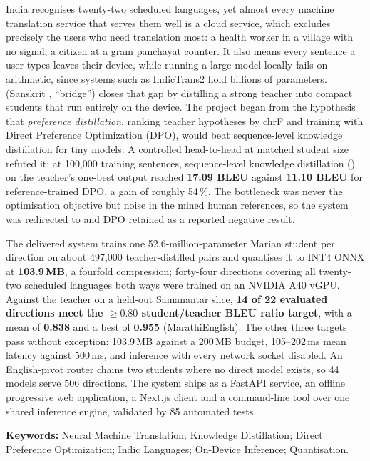 \setcounter{page}{1}
\usefrontmatterstyle
\thispagestyle{frontmatter}

{\fontsize{12}{18}\selectfont
\setlength{\parindent}{0.5in}

India recognises twenty-two scheduled languages, yet almost every machine
translation service that serves them well is a cloud service, which excludes
precisely the users who need translation most: a health worker in a village
with no signal, a citizen at a gram panchayat counter. It also means every
sentence a user types leaves their device, while
running a large model locally fails on arithmetic, since systems such as
IndicTrans2 hold billions of parameters. \setu{} (Sanskrit
, ``bridge'') closes that gap by distilling a strong teacher into
compact students that run entirely on the device. The project began from the
hypothesis that \emph{preference distillation}, ranking teacher hypotheses by
chrF and training with Direct Preference Optimization (DPO), would beat
sequence-level knowledge distillation for tiny models. A controlled head-to-head
at matched student size refuted it: at 100{,}000 training sentences,
sequence-level knowledge distillation (\seqkd{}) on the teacher's one-best
output reached \textbf{17.09 BLEU} against \textbf{11.10 BLEU} for
reference-trained DPO, a gain of roughly 54\,\%. The
bottleneck was never the optimisation objective but noise in the mined human
references, so the system was redirected to \seqkd{} and DPO retained as a
reported negative result.

The delivered system trains one 52.6-million-parameter Marian student per
direction on about 497{,}000 teacher-distilled pairs and quantises it to INT4
ONNX at \textbf{103.9\,MB}, a fourfold compression; forty-four directions
covering all twenty-two scheduled languages both ways were trained on an NVIDIA
A40 vGPU. Against the teacher on a held-out Samanantar slice, \textbf{14 of 22
evaluated directions meet the $\geq 0.80$ student/teacher BLEU ratio target},
with a mean of \textbf{0.838} and a best of \textbf{0.955}
(Marathi\arrowto{}English). The other three targets pass without exception:
103.9\,MB against a 200\,MB budget, 105--202\,ms mean latency against 500\,ms,
and inference with every network socket disabled. An English-pivot router
chains two students where no direct model exists, so 44 models serve 506
directions. The system ships as a FastAPI service, an offline progressive web
application, a Next.js client and a command-line tool over one shared inference
engine, validated by 85 automated tests.

\vspace{6pt}

\noindent\textbf{Keywords:} Neural Machine Translation; Knowledge Distillation;
Direct Preference Optimization; Indic Languages; On-Device Inference;
Quantisation.

}
\clearpage
